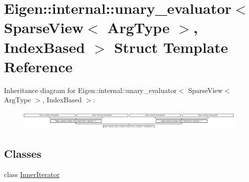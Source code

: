 \hypertarget{struct_eigen_1_1internal_1_1unary__evaluator_3_01_sparse_view_3_01_arg_type_01_4_00_01_index_based_01_4}{}\section{Eigen\+:\+:internal\+:\+:unary\+\_\+evaluator$<$ Sparse\+View$<$ Arg\+Type $>$, Index\+Based $>$ Struct Template Reference}
\label{struct_eigen_1_1internal_1_1unary__evaluator_3_01_sparse_view_3_01_arg_type_01_4_00_01_index_based_01_4}
Inheritance diagram for Eigen\+:\+:internal\+:\+:unary\+\_\+evaluator$<$ Sparse\+View$<$ Arg\+Type $>$, Index\+Based $>$\+:\begin{figure}[H]
\begin{center}
\leavevmode
\includegraphics[height=0.958904cm]{struct_eigen_1_1internal_1_1unary__evaluator_3_01_sparse_view_3_01_arg_type_01_4_00_01_index_based_01_4}
\end{center}
\end{figure}
\subsection*{Classes}
\begin{DoxyCompactItemize}
\item 
class \hyperlink{class_eigen_1_1internal_1_1unary__evaluator_3_01_sparse_view_3_01_arg_type_01_4_00_01_index_based_01_4_1_1_inner_iterator}{Inner\+Iterator}
\end{DoxyCompactItemize}
